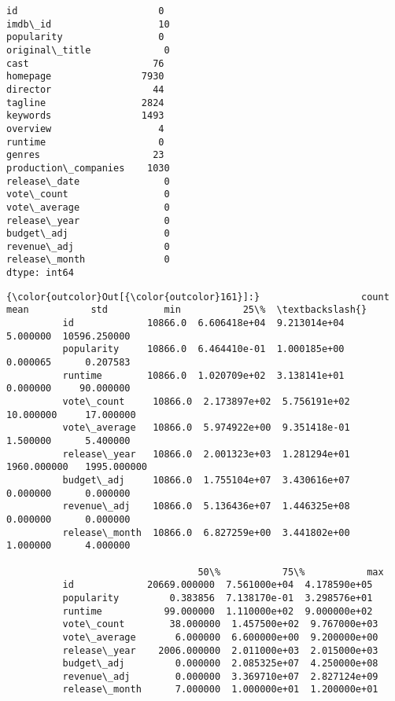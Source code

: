 \documentclass[11pt]{article}
\begin{document}
    \begin{Verbatim}[commandchars=\\\{\}]
id                         0
imdb\_id                   10
popularity                 0
original\_title             0
cast                      76
homepage                7930
director                  44
tagline                 2824
keywords                1493
overview                   4
runtime                    0
genres                    23
production\_companies    1030
release\_date               0
vote\_count                 0
vote\_average               0
release\_year               0
budget\_adj                 0
revenue\_adj                0
release\_month              0
dtype: int64

    \end{Verbatim}

\begin{Verbatim}[commandchars=\\\{\}]
{\color{outcolor}Out[{\color{outcolor}161}]:}                  count          mean           std          min           25\%  \textbackslash{}
          id             10866.0  6.606418e+04  9.213014e+04     5.000000  10596.250000   
          popularity     10866.0  6.464410e-01  1.000185e+00     0.000065      0.207583   
          runtime        10866.0  1.020709e+02  3.138141e+01     0.000000     90.000000   
          vote\_count     10866.0  2.173897e+02  5.756191e+02    10.000000     17.000000   
          vote\_average   10866.0  5.974922e+00  9.351418e-01     1.500000      5.400000   
          release\_year   10866.0  2.001323e+03  1.281294e+01  1960.000000   1995.000000   
          budget\_adj     10866.0  1.755104e+07  3.430616e+07     0.000000      0.000000   
          revenue\_adj    10866.0  5.136436e+07  1.446325e+08     0.000000      0.000000   
          release\_month  10866.0  6.827259e+00  3.441802e+00     1.000000      4.000000   
          
                                  50\%           75\%           max  
          id             20669.000000  7.561000e+04  4.178590e+05  
          popularity         0.383856  7.138170e-01  3.298576e+01  
          runtime           99.000000  1.110000e+02  9.000000e+02  
          vote\_count        38.000000  1.457500e+02  9.767000e+03  
          vote\_average       6.000000  6.600000e+00  9.200000e+00  
          release\_year    2006.000000  2.011000e+03  2.015000e+03  
          budget\_adj         0.000000  2.085325e+07  4.250000e+08  
          revenue\_adj        0.000000  3.369710e+07  2.827124e+09  
          release\_month      7.000000  1.000000e+01  1.200000e+01  
\end{Verbatim}
            
\end{document}
